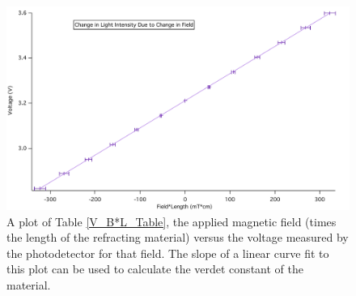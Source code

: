 \documentclass[prb,preprint]{revtex4-1}
\begin{document}
\begin{figure}[h!]
\centering
\includegraphics[width=5in]{V_B-L_Plot.pdf}
\caption{A plot of Table \ref{V_B*L_Table}, the applied magnetic field (times the length of the refracting material) versus the voltage measured by the photodetector for that field. The slope of a linear curve fit to this plot can be used to calculate the verdet constant of the material. }
\label{V_B*L_Plot}
\end{figure}
\end{document}
